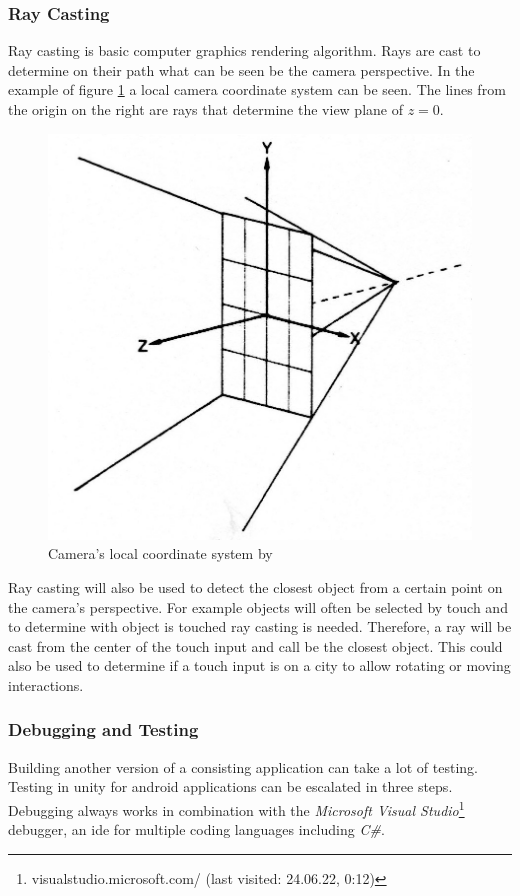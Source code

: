 \subsubsection{Ray Casting}
\label{sec:ray}
Ray casting is basic computer graphics rendering algorithm. 
Rays are cast to determine on their path what can be seen be the camera perspective. 
In the example of figure \ref{fig:ray_example} a local camera coordinate system can be seen.
The lines from the origin on the right are rays that determine the view plane of $z=0$.
\begin{figure}[htb]
    \centering
    \includegraphics[width=1\textwidth]{Fundamentals/img/ray_casting.jpg}
    \caption{Camera's local coordinate system by \cite{roth1982ray}}
    \label{fig:ray_example}
\end{figure}

Ray casting will also be used to detect the closest object from a certain point on the camera's perspective.
For example objects will often be selected by touch and to determine with object is touched ray casting is needed.
Therefore, a ray will be cast from the center of the touch input and call be the closest object. 
This could also be used to determine if a touch input is on a \gls{city} to allow rotating or moving interactions. 

\subsubsection{Debugging and Testing}
Building another version of a consisting application can take a lot of testing.
Testing in \gls{unity} for \gls{android} applications can be escalated in three steps. 
Debugging always works in combination with the \textit{Microsoft Visual Studio}\footnote{visualstudio.microsoft.com/ (last visited: 24.06.22, 0:12)} debugger, an \gls{ide} for multiple coding languages including \textit{C\#}.

